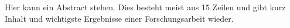 Hier kann ein Abstract stehen. Dies besteht meist aus 15 Zeilen und gibt kurz Inhalt und wichtigste Ergebnisse einer Forschungsarbeit wieder.
